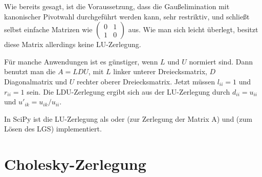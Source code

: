 Wie bereits gesagt, ist die Voraussetzung, dass die Gaußelimination
mit kanonischer Pivotwahl durchgeführt werden kann, sehr restriktiv, und
schließt selbst einfache Matrizen wie {\tiny $\begin{pmatrix} 0 & 1\\
    1 & 0\end{pmatrix}$} aus. Wie man sich leicht überlegt, besitzt
diese Matrix allerdings keine LU-Zerlegung.

Für manche Anwendungen ist es günstiger, wenn $L$ und $U$ normiert
sind. Dann benutzt man die  $A=LDU$, mit $L$
linker unterer Dreiecksmatrix, $D$ Diagonalmatrix und $U$ rechter
oberer Dreiecksmatrix. Jetzt müssen $l_{ii}=1$ und $r_{ii}=1$
sein. Die LDU-Zerlegung ergibt sich aus der LU-Zerlegung durch $d_{ii}
= u_{ii}$ und $u'_{ik}=u_{ik}/u_{ii}$.

In SciPy ist die LU-Zerlegung als
 oder  (zur
Zerlegung der Matrix A) und 
(zum Lösen des LGS) implementiert.

\section{Cholesky-Zerlegung}

